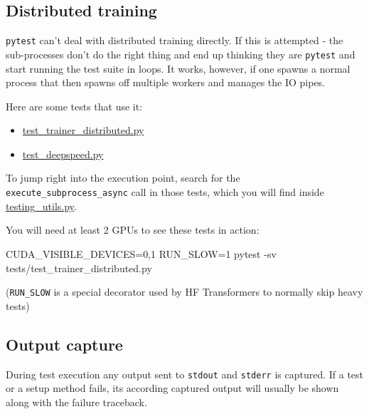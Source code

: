 \documentclass[
]{report}
\newenvironment{Shaded}{\begin{snugshade}}{\end{snugshade}}
\newcommand{\AttributeTok}[1]{\textcolor[rgb]{0.40,0.45,0.13}{#1}}
\newcommand{\ExtensionTok}[1]{\textcolor[rgb]{0.00,0.23,0.31}{#1}}
\newcommand{\NormalTok}[1]{\textcolor[rgb]{0.00,0.23,0.31}{#1}}
\newcommand{\OperatorTok}[1]{\textcolor[rgb]{0.37,0.37,0.37}{#1}}
\newcommand{\VariableTok}[1]{\textcolor[rgb]{0.07,0.07,0.07}{#1}}
\providecommand{\tightlist}{%
  \setlength{\itemsep}{0pt}\setlength{\parskip}{0pt}}\usepackage{longtable,booktabs,array}
\begin{document}
\subsection{Distributed training}\label{distributed-training}

\texttt{pytest} can't deal with distributed training directly. If this
is attempted - the sub-processes don't do the right thing and end up
thinking they are \texttt{pytest} and start running the test suite in
loops. It works, however, if one spawns a normal process that then
spawns off multiple workers and manages the IO pipes.

Here are some tests that use it:

\begin{itemize}
\tightlist
\item
  \href{https://github.com/huggingface/transformers/blob/58e3d23e97078f361a533b9ec4a6a2de674ea52a/tests/trainer/test_trainer_distributed.py}{test\_trainer\_distributed.py}
\item
  \href{https://github.com/huggingface/transformers/blob/58e3d23e97078f361a533b9ec4a6a2de674ea52a/tests/deepspeed/test_deepspeed.py}{test\_deepspeed.py}
\end{itemize}

To jump right into the execution point, search for the
\texttt{execute\_subprocess\_async} call in those tests, which you will
find inside \url{testing_utils.py}.

You will need at least 2 GPUs to see these tests in action:

\begin{Shaded}
\begin{Highlighting}[]
\VariableTok{CUDA\_VISIBLE\_DEVICES}\OperatorTok{=}\NormalTok{0,1 }\VariableTok{RUN\_SLOW}\OperatorTok{=}\NormalTok{1 }\ExtensionTok{pytest} \AttributeTok{{-}sv}\NormalTok{ tests/test\_trainer\_distributed.py}
\end{Highlighting}
\end{Shaded}

(\texttt{RUN\_SLOW} is a special decorator used by HF Transformers to
normally skip heavy tests)

\subsection{Output capture}\label{output-capture}

During test execution any output sent to \texttt{stdout} and
\texttt{stderr} is captured. If a test or a setup method fails, its
according captured output will usually be shown along with the failure
traceback.
\end{document}
